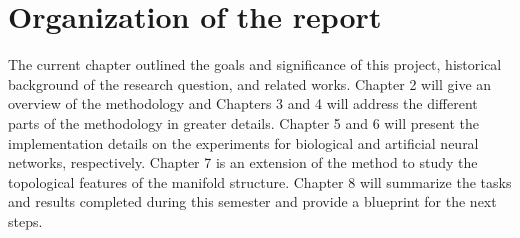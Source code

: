 \section{Organization of the report}

\par The current chapter outlined the goals and significance of this project, historical background of the research question, and related works. Chapter 2 will give an overview of the methodology and Chapters 3 and 4 will address the different parts of the methodology in greater details. Chapter 5 and 6 will present the implementation details on the experiments for biological and artificial neural networks, respectively. Chapter 7 is an extension of the method to study the topological features of the manifold structure. Chapter 8 will summarize the tasks and results completed during this semester and provide a blueprint for the next steps.